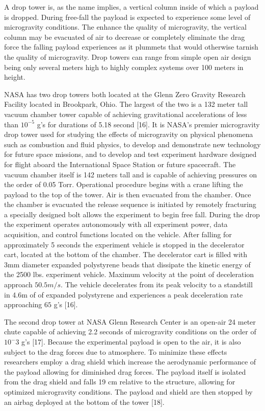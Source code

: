 \indent\indent A drop tower is, as the name implies, a vertical column inside of which a payload is dropped. During free-fall the payload is expected to experience some level of microgravity conditions. The enhance the quality of microgravity, the vertical column may be evacuated of air to decrease or completely eliminate the drag force the falling payload experiences as it plummets that would otherwise tarnish the quality of microgravity. Drop towers can range from simple open air design being only several meters high to highly complex systems over 100 meters in height.

\indent NASA has two drop towers both located at the Glenn Zero Gravity Research Facility located in Brookpark, Ohio. The largest of the two is a 132 meter tall vacuum chamber tower capable of achieving gravitational accelerations of less than $10^{−5}$ g’s for durations of 5.18 second [16]. It is NASA’s premier microgravity drop tower used for studying the effects of microgravity on physical phenomena such as combustion and fluid physics, to develop and demonstrate new technology for future space missions, and to develop and test experiment hardware designed for flight aboard the International Space Station or future spacecraft. The vacuum chamber itself is 142 meters tall and is capable of achieving pressures on the order of 0.05 Torr. Operational procedure begins with a crane lifting the payload to the top of the tower. Air is then evacuated from the chamber. Once the chamber is evacuated the release sequence is initiated by remotely fracturing a specially designed bolt allows the experiment to begin free fall. During the drop the experiment operates autonomously with all experiment power, data acquisition, and control functions located on the vehicle. After falling for approximately 5 seconds the experiment vehicle is stopped in the decelerator cart, located at the bottom of the chamber. The decelerator cart is filled with 3mm diameter expanded polystyrene beads that dissipate the kinetic energy of the 2500 lbs. experiment vehicle. Maximum velocity at the point of deceleration approach $50.5 m/s$. The vehicle decelerates from its peak velocity to a standstill in 4.6m of of expanded polystyrene and experiences a peak deceleration rate approaching $65$ g’s [16].

\indent The second drop tower at NASA Glenn Research Center is an open-air 24 meter chute capable of achieving 2.2 seconds of microgravity conditions on the order of $10^−3$ g’s [17]. Because the experimental payload is open to the air, it is also subject to the drag forces due to atmosphere. To minimize these effects researchers employ a drag shield which increase the aerodynamic performance of the payload allowing for diminished drag forces. The payload itself is isolated from the drag shield and falls 19 cm relative to the structure, allowing for optimized microgravity conditions. The payload and shield are then stopped by an airbag deployed at the bottom of the tower [18].

